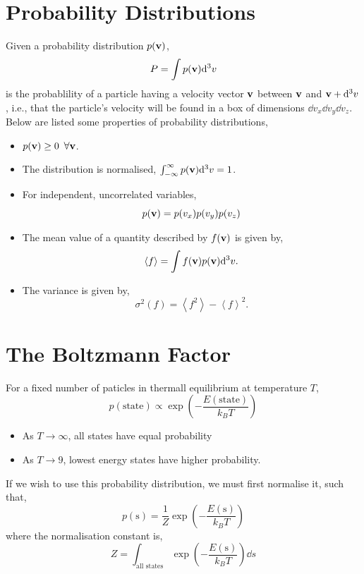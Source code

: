 \documentclass{book}
\begin{document}
\section{Probability Distributions}
Given a probability distribution $p(\vb{v})$,
\begin{equation}
	P = \int p(\vb{v}) \dd^3v
\end{equation}
is the probablility of a particle having a velocity vector $\vb{v}$ between $\vb{v}$ and $\vb{v} + \dd^3v$, i.e., that the particle's velocity will be found in a box of dimensions $\dd{v}_x\dd{v}_y\dd{v}_z$. Below are listed some properties of probability distributions,
\begin{itemize}
	\item $p(\vb{v}) \geq 0$ $\forall \vb{v}$.
	\item The distribution is normalised, $\int_{-\infty}^{\infty} p(\vb{v})\dd^3v = 1$.
	\item For independent, uncorrelated variables,
	\begin{equation}
		p(\vb{v}) = p(v_x)p(v_y)p(v_z)
	\end{equation}
	\item The mean value of a quantity described by $f(\vb{v})$ is given by,
	\begin{equation}
		\left<f\right> = \int f(\vb{v})p(\vb{v})\dd^3v.
	\end{equation}
	\item The variance is given by,
	\begin{equation}
		\sigma^2(f) = \left<f^2\right> - \left<f\right>^2.
	\end{equation}
\end{itemize}
\section{The Boltzmann Factor}
For a fixed number of paticles in thermall equilibrium at temperature $T$,
\begin{equation}
	\boxed{p(\text{state}) \propto \exp\left(-\frac{E(\text{state})}{k_BT}\right)}
\end{equation}
\begin{itemize}
	\item As $T \to \infty$, all states have equal probability
	\item As $T \to 9$, lowest energy states have higher probability.
\end{itemize}
If we wish to use this probability distribution, we must first normalise it, such that,
\begin{equation}
	p(\text{s}) = \frac{1}{Z}\exp\left(-\frac{E(\text{s})}{k_BT}\right)
\end{equation}
where the normalisation constant is,
\begin{equation}
	Z = \int_{\text{all states}}\exp\left(-\frac{E(\text{s})}{k_BT}\right)\dd{s}
\end{equation}
\end{document}
